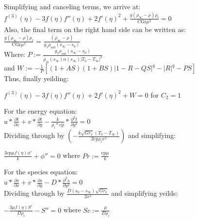 \documentclass[letterpaper, 10pt]{article}
\begin{document}
\noindent Simplifying and canceling terms, we arrive at:\\
$f^{(3)}(\eta )-3 f(\eta ) f''(\eta )+2 f'(\eta )^2 + \frac{g (\rho_\infty - \rho) \rho_l}{\text{CGr} \mu^2} = 0 $\\

\noindent Also, the final term on the right hand side can be written as:\\ 
 $\frac{g (\rho_\infty - \rho) \rho_l}{\text{CGr} \mu^2}$ = $\frac{(\rho_\infty - \rho)}{g_1 \rho_{m0} (s_\infty - s_0)}$\\ 
 
\noindent Where: $P := \frac{g_1 \rho_{m0} (s_\infty - s_0)}{\rho_m (s_\infty) \alpha (s_\infty) |T_0 - T_\infty|^2}$\\ 
and $W := -\frac{1}{P}\left[ (1+AS)(1+BS)|1-R-QS|^q-|R|^q-PS\right]$\\

Thus, finally yeilding:\\
\begin{center}
	$f^{(3)}(\eta )-3 f(\eta ) f''(\eta )+2 f'(\eta )^2 + W = 0 $ for $C_2 = 1$
\end{center}

\noindent For the energy equation:\\
$u*\frac{\partial t}{\partial x}+v*\frac{\partial t}{\partial y}-\frac{k}{\rho_l*\text{cp}}*\frac{\partial^2 t}{\partial y^2} = 0$\\

\noindent Dividing through by $\left(-\frac{k \sqrt{Gr_x} (T_0-T_\infty)}{2 \text{cp} \rho_l x^2}\right)$ and simplifying:\\
\begin{center}
	$\frac{3 \text{cp} \mu  f(\eta ) \phi'}{k}+\phi'' = 0$ where $Pr := \frac{\text{cp} \mu}{k}$\\
\end{center}
For the species equation:\\
$u*\frac{\partial s}{\partial x}+v*\frac{\partial s}{\partial y}-D*\frac{\partial^2 s}{\partial y^2} = 0$\\

\noindent Dividing through by $\frac{D(s_0-s_\infty)\sqrt{Gr_x}}{2 x^2}$ and simplifying yeilds:\\
\begin{center}
	$-\frac{3 \mu  f(\eta ) S'}{D \rho_l}-S'' = 0$ where $Sc := \frac{\mu}{D \rho_l} $
\end{center}

\end{document}
